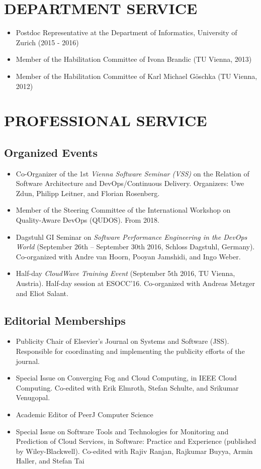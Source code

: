 \documentclass[paper=letter,fontsize=11pt]{scrartcl} %
\newcommand{\NewPart}[2]{\section*{\uppercase{#1} #2}}
\begin{document}
\NewPart{Department Service}{}
\begin{itemize}
\item Postdoc Representative at the Department of Informatics, University of Zurich (2015 - 2016)
\item Member of the Habilitation Committee of Ivona Brandic (TU Vienna, 2013)
\item Member of the Habilitation Committee of Karl Michael G\"oschka (TU Vienna, 2012)
\end{itemize}

\NewPart{Professional Service}{}

\subsection*{Organized Events}
\begin{itemize}
\item Co-Organizer of the 1st \emph{Vienna Software Seminar (VSS)} on the Relation of Software Architecture and DevOps/Continuous Delivery. Organizers: Uwe Zdun, Philipp Leitner, and Florian Rosenberg.
\item Member of the Steering Committee of the International Workshop on Quality-Aware DevOps (QUDOS). From 2018.
\item Dagstuhl GI Seminar on \emph{Software Performance Engineering in the DevOps World} (September 26th – September 30th 2016, Schloss Dagstuhl, Germany). Co-organized with Andre van Hoorn, Pooyan Jamshidi, and Ingo Weber.
\item Half-day \emph{CloudWave Training Event} (September 5th 2016, TU Vienna, Austria). Half-day session at ESOCC'16. Co-organized with Andreas Metzger and Eliot Salant.
\end{itemize}

\subsection*{Editorial Memberships}
\begin{itemize}
\item Publicity Chair of Elsevier's Journal on Systems and Software (JSS). Responsible for coordinating and implementing the publicity efforts of the journal.
\item Special Issue on Converging Fog and Cloud Computing, in IEEE Cloud Computing. Co-edited with Erik Elmroth, Stefan Schulte, and Srikumar Venugopal.
\item Academic Editor of PeerJ Computer Science
\item Special Issue on Software Tools and Technologies for Monitoring and Prediction of Cloud Services, in Software: Practice and Experience (published by Wiley-Blackwell). Co-edited with Rajiv Ranjan, Raj\-kumar Buyya, Armin Haller, and Stefan Tai
\end{itemize}
\end{document}
